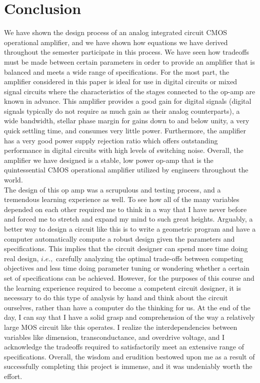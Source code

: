 \documentclass[]{article}
\begin{document}
		\section{Conclusion}
			We have shown the design process of an analog integrated circuit CMOS operational amplifier, and we have shown how equations we have derived throughout the semester participate in this process. We have seen how tradeoffs must be made between certain parameters in order to provide an amplifier that is balanced and meets a wide range of specifications. For the most part, the amplifier considered in this paper is ideal for use in digital circuits or mixed signal circuits where the characteristics of the stages connected to the op-amp are known in advance. This amplifier provides a good gain for digital signals (digital signals typically do not require as much gain as their analog counterparts), a wide bandwidth, stellar phase margin for gains down to and below unity, a very quick settling time, and consumes very little power. Furthermore, the amplifier has a very good power supply rejection ratio which offers outstanding performance in digital circuits with high levels of switching noise. Overall, the amplifier we have designed is a stable, low power op-amp that is the quintessential CMOS operational amplifier utilized by engineers throughout the world.
			$$$$
			The design of this op amp was a scrupulous and testing process, and a tremendous learning experience as well. To see how all of the many variables depended on each other required me to think in a way that I have never before and forced me to stretch and expand my mind to such great heights. Arguably, a better way to design a circuit like this is to write a geometric program and have a computer automatically compute a robust design given the parameters and specifications. This implies that the circuit designer can spend more time doing real design, $i.e.,$ carefully analyzing the optimal trade-offs between competing objectives and less time doing parameter tuning or wondering whether a certain set of specifications can be achieved. However, for the purposes of this course and the learning experience required to become a competent circuit designer, it is necessary to do this type of analysis by hand and think about the circuit ourselves, rather than have a computer do the thinking for us. At the end of the day, I can say that I have a solid grasp and comprehension of the way a relatively large MOS circuit like this operates. I realize the interdependencies between variables like dimension, transconductance, and overdrive voltage, and I acknowledge the tradeoffs required to satisfactorily meet an extensive range of specifications. Overall, the wisdom and erudition bestowed upon me as a result of successfully completing this project is immense, and it was undeniably worth the effort.
		
	
	
\end{document}
